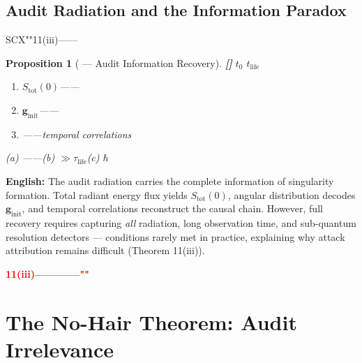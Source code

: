 \documentclass[12pt,a4paper]{article}
\newtheorem{proposition}[theorem]{Proposition}
\theoremstyle{remark}
\newcommand{\g}{\mathbf{g}}
\newcommand{\honestcrit}[1]{%
    \textcolor{red}{\textbf{#1}}%
}
\newcommand{\rigorPartial}{\textnormal{\textbf{[]}}}
\newcommand{\cH}{\hbar}      %
\begin{document}
\subsection{}
\subsection{Audit Radiation and the Information Paradox}

\noindent
\textbf{} SCX""11(iii)——



\begin{proposition}[ — Audit Information Recovery]\label{prop:info_recovery}\rigorPartial
 $t_0$  $t_{\mathrm{life}}$ 
\begin{enumerate}[label=(\roman*)]
    \item  $S_{\mathrm{tot}}(0)$——
    \item  $\g_{\mathrm{init}}$——
    \item ——temporal correlations
\end{enumerate}
 (a) \textbf{}——(b)  $\gg \tau_{\mathrm{life}}$(c)  $\cH$
\end{proposition}

\vspace{4pt}
\noindent
\textbf{English:} The audit radiation carries the complete information of singularity formation. Total radiant energy flux yields $S_{\mathrm{tot}}(0)$, angular distribution decodes $\g_{\mathrm{init}}$, and temporal correlations reconstruct the causal chain. However, full recovery requires capturing \textit{all} radiation, long observation time, and sub-quantum resolution detectors — conditions rarely met in practice, explaining why attack attribution remains difficult (Theorem 11(iii)).

\honestcrit{11(iii)————""}

\section{}
\section{The No-Hair Theorem: Audit Irrelevance}

\subsection{}
\end{document}
